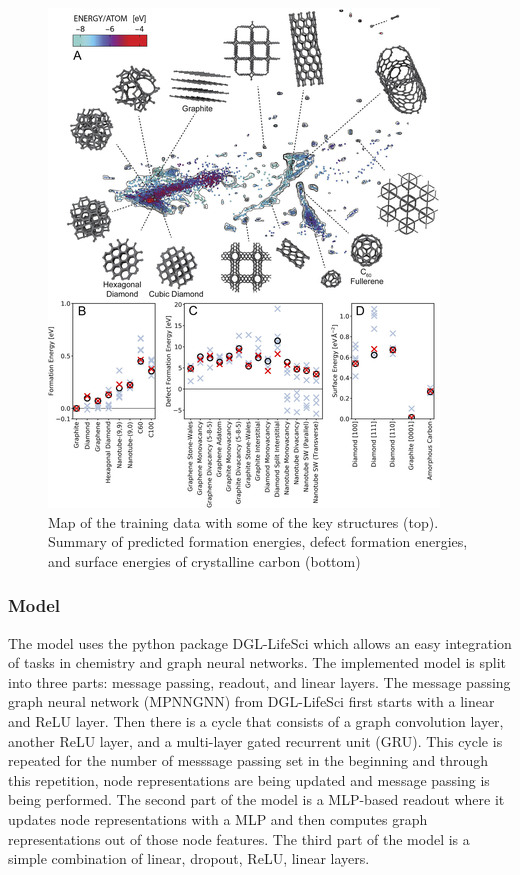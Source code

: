 \documentclass[12pt]{scrartcl}
\begin{document}
\begin{figure}
  \centering
  \includegraphics[scale=2]{carbon}
  
  \caption{Map of the training data with some of the key structures (top). Summary of predicted formation energies, defect formation energies, and surface energies of crystalline carbon (bottom)}\label{fig:train}
\end{figure}

\newpage
\subsubsection{Model} 
The model uses the python package DGL-LifeSci\cite{dgllife} which allows an easy integration of tasks in 
chemistry and graph neural networks. The implemented model is split into three parts: message passing, 
readout, and linear layers. The message passing graph neural network (MPNNGNN) from DGL-LifeSci first starts 
with a linear and ReLU layer. Then there is a cycle that consists of a graph convolution layer, another 
ReLU layer, and a multi-layer gated recurrent unit (GRU). This cycle is repeated for the number of 
messsage passing set in the beginning and through this repetition, node representations are being updated 
and message passing is being performed. The second part of the model is a MLP-based readout where it 
updates node representations with a MLP and then computes graph representations out of those node features. 
The third part of the model is a simple combination of linear, dropout, ReLU, linear layers.
\end{document}
